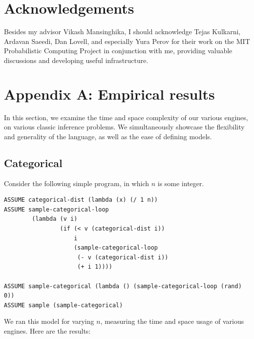 \documentclass[10pt]{article}
\begin{document}
\section{Acknowledgements}

Besides my advisor Vikash Mansinghika, I should acknowledge Tejas Kulkarni, Ardavan Saeedi, Dan Lovell, and especially Yura Perov for their work on the MIT Probabilistic Computing Project in conjunction with me, providing valuable discussions and developing useful infrastructure.  

\appendix

\section{Appendix A: Empirical results}

In this section, we examine the time and space complexity of our various engines, on various classic inference problems.  We simultaneously showcase the flexibility and generality of the language, as well as the ease of defining models.  


\subsection{Categorical}
Consider the following simple program, in which $n$ is some integer.

\begin{leftbar} \begin{small} \begin{verbatim}
ASSUME categorical-dist (lambda (x) (/ 1 n))
ASSUME sample-categorical-loop 
        (lambda (v i)
                (if (< v (categorical-dist i)) 
                    i 
                    (sample-categorical-loop 
                     (- v (categorical-dist i))
                     (+ i 1))))

ASSUME sample-categorical (lambda () (sample-categorical-loop (rand) 0))
ASSUME sample (sample-categorical)
\end{verbatim} \end{small} \end{leftbar}

We ran this model for varying $n$, measuring the time and space usage of various engines.  Here are the results:
\end{document}
